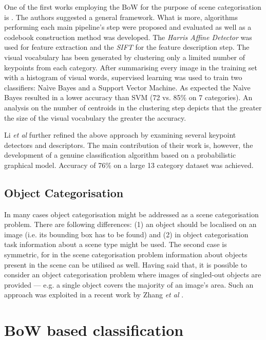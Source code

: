   One of the first works employing the BoW for the purpose of scene categorisation is \cite{csurka2004visual}. The authors suggested a general framework. What is more, algorithms performing each main pipeline's step were proposed and evaluated as well as a codebook construction method was developed. The \emph{Harris Affine Detector} was used for feature extraction and the \emph{SIFT} for the feature description step. The visual vocabulary has been generated by clustering only a limited number of keypoints from each category. After summarising every image in the training set with a histogram of visual words, supervised learning was used to train two classifiers: Na\`ive Bayes and a Support Vector Machine. As expected the Na\`ive Bayes resulted in a lower accuracy than SVM (72 vs. 85\% on 7 categories). An analysis on the number of centroids in the clustering step depicts that the greater the size of the visual vocabulary the greater the accuracy. 
  
  Li \emph{et al} further refined the above approach by examining several keypoint detectors and descriptors. The main contribution of their work is, however, the development of a genuine classification algorithm based on a probabilistic graphical model. Accuracy of 76\% on a large 13 category dataset was achieved.
  
  \subsection{Object Categorisation}
  
  In many cases object categorisation might be addressed as a scene categorisation problem. There are following differences: (1) an object should be localised on an image (i.e. its bounding box has to be found) and (2) in object categorisation task information about a scene type might be used. The second case is symmetric, for in the scene categorisation problem information about objects present in the scene can be utilised as well. Having said that, it is possible to consider an object categorisation problem where images of singled-out objects are provided --- e.g. a single object covers the majority of an image's area. Such an approach was exploited in a recent work by Zhang \emph{et al} \cite{zhangcategory}. 
  

\section{BoW based classification}

